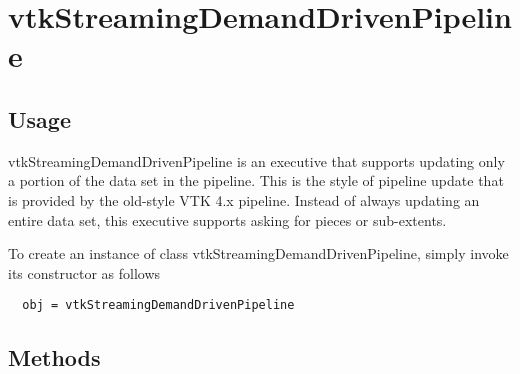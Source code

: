 \section{vtkStreamingDemandDrivenPipeline}

\subsection{Usage}

 vtkStreamingDemandDrivenPipeline is an executive that supports
 updating only a portion of the data set in the pipeline.  This is
 the style of pipeline update that is provided by the old-style VTK
 4.x pipeline.  Instead of always updating an entire data set, this
 executive supports asking for pieces or sub-extents.

To create an instance of class vtkStreamingDemandDrivenPipeline, simply
invoke its constructor as follows
\begin{verbatim}
  obj = vtkStreamingDemandDrivenPipeline
\end{verbatim}
\subsection{Methods}

